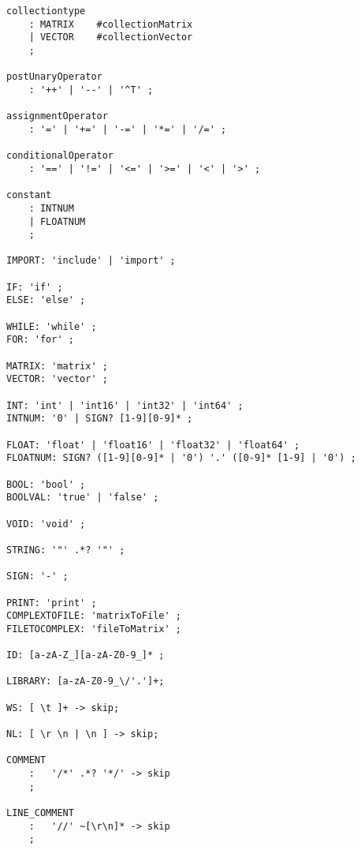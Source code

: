 \begin{lstlisting}[caption={\acrshort{cfg} and Lexing rules},frame=tlrb,numbers=none]
collectiontype
    : MATRIX    #collectionMatrix
    | VECTOR    #collectionVector
    ;

postUnaryOperator 
    : '++' | '--' | '^T' ;

assignmentOperator
    : '=' | '+=' | '-=' | '*=' | '/=' ;

conditionalOperator
    : '==' | '!=' | '<=' | '>=' | '<' | '>' ;

constant
    : INTNUM  
    | FLOATNUM 
    ;

IMPORT: 'include' | 'import' ;  
  
IF: 'if' ;
ELSE: 'else' ;

WHILE: 'while' ;
FOR: 'for' ;

MATRIX: 'matrix' ;
VECTOR: 'vector' ;

INT: 'int' | 'int16' | 'int32' | 'int64' ;
INTNUM: '0' | SIGN? [1-9][0-9]* ;

FLOAT: 'float' | 'float16' | 'float32' | 'float64' ;  
FLOATNUM: SIGN? ([1-9][0-9]* | '0') '.' ([0-9]* [1-9] | '0') ;

BOOL: 'bool' ;
BOOLVAL: 'true' | 'false' ;

VOID: 'void' ;

STRING: '"' .*? '"' ;

SIGN: '-' ;   

PRINT: 'print' ;
COMPLEXTOFILE: 'matrixToFile' ;
FILETOCOMPLEX: 'fileToMatrix' ;

ID: [a-zA-Z_][a-zA-Z0-9_]* ;    

LIBRARY: [a-zA-Z0-9_\/'.']+;

WS: [ \t ]+ -> skip;

NL: [ \r \n | \n ] -> skip;

COMMENT
    :   '/*' .*? '*/' -> skip
    ;

LINE_COMMENT
    :   '//' ~[\r\n]* -> skip
    ;                                                                      
\end{lstlisting}